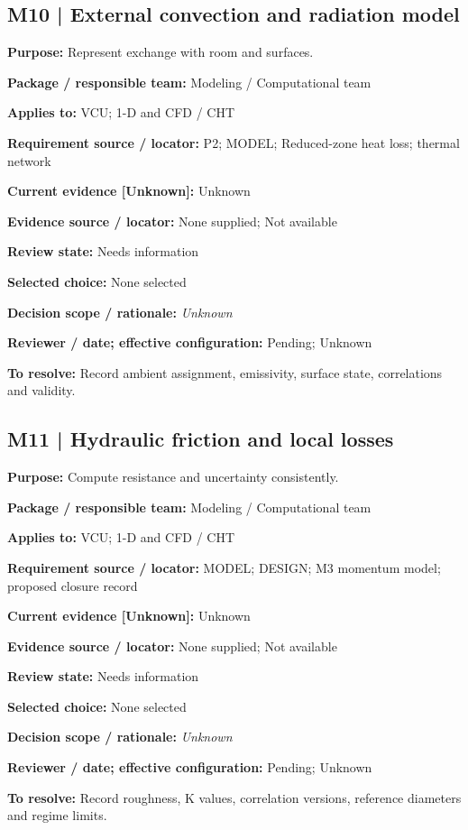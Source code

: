 \documentclass[11pt]{article}
\begin{document}
\begin{minipage}{\textwidth}\small\setlength{\parskip}{2pt}
\subsection*{M10 | External convection and radiation model}
\textbf{Purpose:} Represent exchange with room and surfaces.\par
\textbf{Package / responsible team:} Modeling / Computational team\par
\textbf{Applies to:} VCU; 1-D and CFD / CHT\par
\textbf{Requirement source / locator:} P2; MODEL; Reduced-zone heat loss; thermal network\par
\textbf{Current evidence [Unknown]:} Unknown\par
\textbf{Evidence source / locator:} None supplied; Not available\par
\textbf{Review state:} Needs information\par
\textbf{Selected choice:} None selected\par
\textbf{Decision scope / rationale:} \textit{Unknown}\par
\textbf{Reviewer / date; effective configuration:} Pending; Unknown\par
\textbf{To resolve:} Record ambient assignment, emissivity, surface state, correlations and validity.\par
\end{minipage}\par\vspace{5pt}
\begin{minipage}{\textwidth}\small\setlength{\parskip}{2pt}
\subsection*{M11 | Hydraulic friction and local losses}
\textbf{Purpose:} Compute resistance and uncertainty consistently.\par
\textbf{Package / responsible team:} Modeling / Computational team\par
\textbf{Applies to:} VCU; 1-D and CFD / CHT\par
\textbf{Requirement source / locator:} MODEL; DESIGN; M3 momentum model; proposed closure record\par
\textbf{Current evidence [Unknown]:} Unknown\par
\textbf{Evidence source / locator:} None supplied; Not available\par
\textbf{Review state:} Needs information\par
\textbf{Selected choice:} None selected\par
\textbf{Decision scope / rationale:} \textit{Unknown}\par
\textbf{Reviewer / date; effective configuration:} Pending; Unknown\par
\textbf{To resolve:} Record roughness, K values, correlation versions, reference diameters and regime limits.\par
\end{minipage}\par\vspace{5pt}
\end{document}

